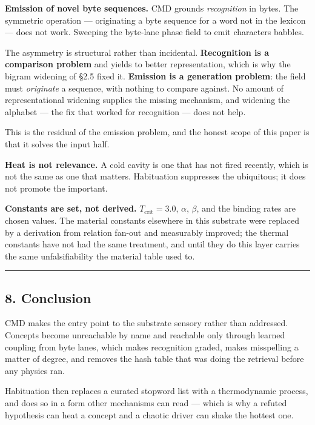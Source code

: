 \documentclass[
  11pt,
  a4paper,
]{article}
\begin{document}
\textbf{Emission of novel byte sequences.} CMD grounds
\emph{recognition} in bytes. The symmetric operation --- originating a
byte sequence for a word not in the lexicon --- does not work. Sweeping
the byte-lane phase field to emit characters babbles.

The asymmetry is structural rather than incidental. \textbf{Recognition
is a comparison problem} and yields to better representation, which is
why the bigram widening of §2.5 fixed it. \textbf{Emission is a
generation problem}: the field must \emph{originate} a sequence, with
nothing to compare against. No amount of representational widening
supplies the missing mechanism, and widening the alphabet --- the fix
that worked for recognition --- does not help.

This is the residual of the emission problem, and the honest scope of
this paper is that it solves the input half.

\textbf{Heat is not relevance.} A cold cavity is one that has not fired
recently, which is not the same as one that matters. Habituation
suppresses the ubiquitous; it does not promote the important.

\textbf{Constants are set, not derived.} \(T_{\text{crit}} = 3.0\),
\(\alpha\), \(\beta\), and the binding rates are chosen values. The
material constants elsewhere in this substrate were replaced by a
derivation from relation fan-out and measurably improved; the thermal
constants have not had the same treatment, and until they do this layer
carries the same unfalsifiability the material table used to.

\begin{center}\rule{0.5\linewidth}{0.5pt}\end{center}

\subsection{8. Conclusion}\label{conclusion}

CMD makes the entry point to the substrate sensory rather than
addressed. Concepts become unreachable by name and reachable only
through learned coupling from byte lanes, which makes recognition
graded, makes misspelling a matter of degree, and removes the hash table
that was doing the retrieval before any physics ran.

Habituation then replaces a curated stopword list with a thermodynamic
process, and does so in a form other mechanisms can read --- which is
why a refuted hypothesis can heat a concept and a chaotic driver can
shake the hottest one.
\end{document}
